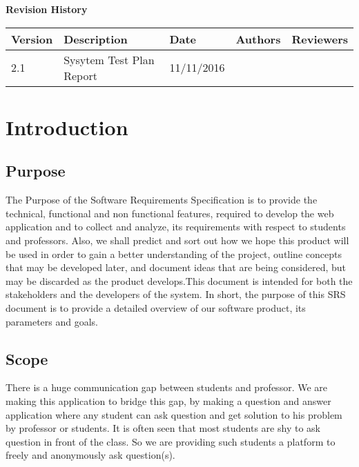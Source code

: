 \documentclass[12pt]{article}
\begin{document}
	\textbf{Revision History}
	\begin{center}
		\begin{tabular}{ | m{3em} | m{8em} | m{5em} | m{4em} | m{4em} | }
			\hline
			Version & Description & Date       & Authors            & Reviewers \\
			\hline
			2.1     & Sysytem Test Plan Report    & 11/11/2016 &  &   \\ 
			\hline
		
		\end{tabular}
	\end{center}
	
	\newpage
	\tableofcontents
	
	\newpage
	
\section{Introduction}

\subsection{Purpose}
The Purpose of the Software Requirements Specification is to provide the technical, functional and non functional features, required to develop the web application and to collect and analyze, its requirements with respect to students and professors. Also, we shall predict and sort out how we hope this product will be used in order to gain a better understanding of the project, outline concepts that may be developed later, and document ideas that are being considered, but may be discarded as the product develops.This document is intended for both the stakeholders and the developers of the system. In short, the
purpose of this SRS document is to provide a detailed overview of our software product, its parameters
and goals.

\subsection{Scope}
There is a huge communication gap between students and professor. We are making this application to bridge this gap, by making a question and answer application where any student can ask question and get solution to his problem by professor or students. It is often seen that most students are shy to ask question in front of the class. So we are providing such students a platform to freely and anonymously ask question(s).
\end{document}
